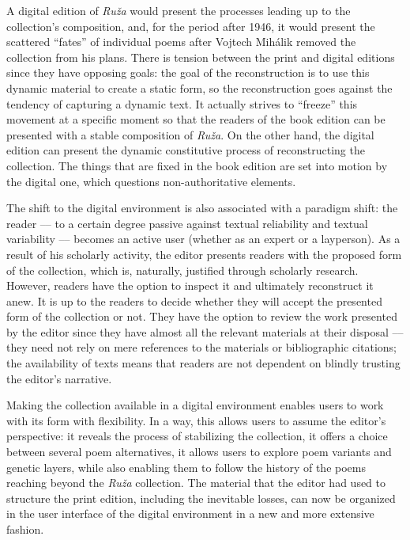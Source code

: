\begin{paper}
A digital edition of \emph{Ruža} would present the processes leading up
to the collection's composition, and, for the period after 1946, it would
present the scattered ``fates'' of individual poems after Vojtech
Mihálik removed the collection from his plans. There is tension between
the print and digital editions since they have opposing goals: the goal
of the reconstruction is to use this dynamic material to create a static
form, so the reconstruction goes against the tendency of capturing
a dynamic text. It actually strives to ``freeze'' this movement at
a specific moment so that the readers of the book edition can be
presented with a stable composition of \emph{Ruža}. On the other hand,
the digital edition can present the dynamic constitutive process of
reconstructing the collection. The things that are fixed in the book
edition are set into motion by the digital one, which questions
non-authoritative elements.

The shift to the digital environment is also associated with a paradigm
shift: the reader –– to a certain degree passive against textual
reliability and textual variability –– becomes an active user (whether
as an expert or a layperson). As a result of his scholarly activity, the
editor presents readers with the proposed form of the collection, which
is, naturally, justified through scholarly research. However, readers
have the option to inspect it and ultimately reconstruct it anew. It is
up to the readers to decide whether they will accept the presented form
of the collection or not. They have the option to review the work
presented by the editor since they have almost all the relevant
materials at their disposal –– they need not rely on mere references to
the materials or bibliographic citations; the availability of texts
means that readers are not dependent on blindly trusting the editor's
narrative.

Making the collection available in a digital environment enables users
to work with its form with flexibility. In a way, this allows users to
assume the editor's perspective: it reveals the process of stabilizing
the collection, it offers a choice between several poem alternatives, it
allows users to explore poem variants and genetic layers, while also
enabling them to follow the history of the poems reaching beyond the
\emph{Ruža} collection. The material that the editor had used to
structure the print edition, including the inevitable losses, can now be
organized in the user interface of the digital environment in a new and
more extensive fashion.


\end{paper}
